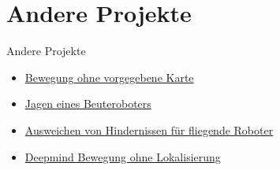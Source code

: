 \documentclass[aspectratio=169]{beamer}
\begin{document}
  \section{Andere Projekte}
  \begin{frame}{Andere Projekte}
  	\begin{itemize}
  		\item \href{https://youtu.be/9AOIwBYIBbs?t=70}{Bewegung ohne vorgegebene Karte}
  		\item \href{https://www.youtube.com/watch?v=fL3YCIPxuhM&feature=youtu.be}{Jagen eines Beuteroboters}
  		\item \href{https://youtu.be/hNsP6-K3Hn4?t=40}{Ausweichen von Hindernissen für fliegende Roboter}
  		\item \href{https://www.youtube.com/watch?v=nMR5mjCFZCw}{Deepmind Bewegung ohne Lokalisierung}
  	\end{itemize}
  \end{frame}
  
\end{document}
